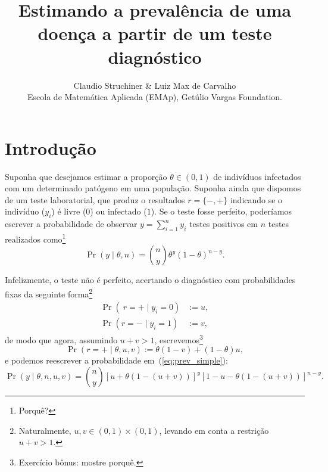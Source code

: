 \documentclass[a4paper, notitlepage, 10pt]{article}
\title{\vspace{-9ex}\centering \bf Estimando a prevalência de uma doença a partir de um teste diagnóstico}
\author{
Claudio Struchiner \& Luiz Max de Carvalho \\
Escola de Matemática Aplicada (EMAp), Get\'ulio Vargas Foundation.
}
\begin{document}
\maketitle

% 


\section*{Introdução}

Suponha que desejamos estimar a proporção $\theta \in (0, 1)$ de indivíduos infectados com um determinado patógeno em uma população.
Suponha ainda que dispomos de um teste laboratorial, que produz o resultados $r = \{-, +\}$ indicando se o indivíduo ($y_i$) é livre ($0$) ou infectado ($1$).
Se o teste fosse perfeito, poderíamos escrever a probabilidade de observar $y = \sum_{i =1}^n y_i$ testes positivos em $n$ testes realizados como\footnote{Porquê?}
\begin{equation}
\label{eq:prev_simple}
 \operatorname{Pr}\left( y \mid \theta, n \right) = \binom{n}{y} \theta^y (1-\theta)^{n-y}. 
\end{equation}

Infelizmente, o teste não é perfeito, acertando o diagnóstico com probabilidades fixas da seguinte forma\footnote{Naturalmente, $u, v \in (0, 1) \times (0, 1)$, levando em conta a restrição $u + v > 1$.}
\begin{align}
 \operatorname{Pr}\left(\ r = + \mid y_i = 0 \right) &:= u,\\
 \operatorname{Pr}\left( r = - \mid y_i = 1 \right) &:= v,
\end{align}
de modo que agora, assumindo $u + v > 1$, escrevemos\footnote{Exercício bônus: mostre porquê.}
\begin{equation}
  \operatorname{Pr}\left(r = + \mid \theta, u, v \right) := \theta ( 1- v) + (1-\theta)u,
\end{equation}
e podemos reescrever a probabilidade em~(\ref{eq:prev_simple}):
\begin{equation}
 \operatorname{Pr}\left(y \mid \theta, n, u, v\right) = \binom{n}{y} \left[ u + \theta ( 1- (u  + v)) \right]^{y} \left[ 1 -u - \theta (1 -(u + v))\right]^{n-y}.
\end{equation}
\end{document}
